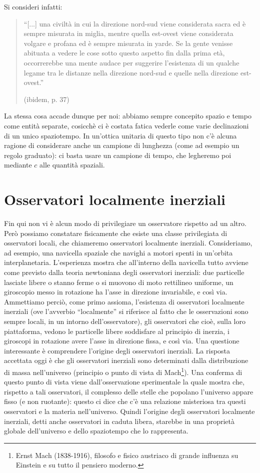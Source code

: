 Si consideri infatti:
\begin{quote}
``[...] una civiltà in cui la direzione nord-sud viene considerata sacra
ed è sempre misurata in miglia, mentre quella est-ovest viene considerata 
volgare e profana ed è sempre misurata in yarde. Se la gente
venisse abituata a vedere le cose sotto questo aspetto fin dalla prima
età, occorrerebbe una mente audace per suggerire l'esistenza di un
qualche legame tra le distanze nella direzione nord-sud e quelle nella
direzione est-ovest.''

(ibidem, p. 37)
\end{quote}

La stessa cosa accade dunque per noi: abbiamo sempre concepito spazio
e tempo come entità separate, cosicchè ci è costata fatica vederle come varie
declinazioni di un unico spaziotempo. In un'ottica unitaria di questo tipo
non c'è alcuna ragione di considerare anche un campione di lunghezza (come
ad esempio un regolo graduato): ci basta usare un campione di tempo, che
legheremo poi mediante $c$ alle quantità spaziali.

\section{Osservatori localmente inerziali}
Fin qui non vi è alcun modo di privilegiare un osservatore rispetto ad un
altro. Però possiamo constatare fisicamente che esiste una classe privilegiata
di osservatori locali, che chiameremo osservatori localmente inerziali.
Consideriamo, ad esempio, una navicella spaziale che navighi a motori spenti
in un'orbita interplanetaria. L'esperienza mostra che all'interno della navicella 
tutto avviene come previsto dalla teoria newtoniana degli osservatori
inerziali: due particelle lasciate libere o stanno ferme o si muovono di moto
rettilineo uniforme, un giroscopio messo in rotazione ha l'asse in direzione
invariabile, e così via. Ammettiamo perciò, come primo assioma, l'esistenza
di osservatori localmente inerziali (ove l'avverbio ``localmente'' si riferisce al
fatto che le osservazioni sono sempre locali, in un intorno dell'osservatore),
gli osservatori che cioè, sulla loro piattaforma, vedono le particelle libere soddisfare 
al principio di inerzia, i giroscopi in rotazione avere l'asse in direzione fissa, e così via.
Una questione interessante è comprendere l'origine degli osservatori inerziali. 
La risposta accettata oggi è che gli osservatori inerziali sono determinati 
dalla distribuzione di massa nell'universo (principio o punto di vista di
Mach\footnote{Ernst Mach (1838-1916), filosofo e fisico austriaco di grande influenza su Einstein e su
tutto il pensiero moderno.}). Una conferma di questo punto di vista viene dall'osservazione sperimentale 
la quale mostra che, rispetto a tali osservatori, il complesso delle
stelle che popolano l'universo appare fisso (e non ruotante): questo ci dice che
c'è una relazione misteriosa tra questi osservatori e la materia nell'universo.
Quindi l'origine degli osservatori localmente inerziali, detti anche osservatori
in caduta libera, starebbe in una proprietà globale dell'universo e dello spaziotempo 
che lo rappresenta. 

